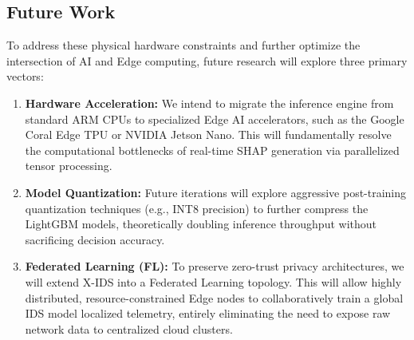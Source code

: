 \subsection{Future Work}
To address these physical hardware constraints and further optimize the intersection of AI and Edge computing, future research will explore three primary vectors:
\begin{enumerate}
    \item \textbf{Hardware Acceleration:} We intend to migrate the inference engine from standard ARM CPUs to specialized Edge AI accelerators, such as the Google Coral Edge TPU or NVIDIA Jetson Nano. This will fundamentally resolve the computational bottlenecks of real-time SHAP generation via parallelized tensor processing.
    \item \textbf{Model Quantization:} Future iterations will explore aggressive post-training quantization techniques (e.g., INT8 precision) to further compress the LightGBM models, theoretically doubling inference throughput without sacrificing decision accuracy.
    \item \textbf{Federated Learning (FL):} To preserve zero-trust privacy architectures, we will extend X-IDS into a Federated Learning topology. This will allow highly distributed, resource-constrained Edge nodes to collaboratively train a global IDS model localized telemetry, entirely eliminating the need to expose raw network data to centralized cloud clusters.
\end{enumerate}
